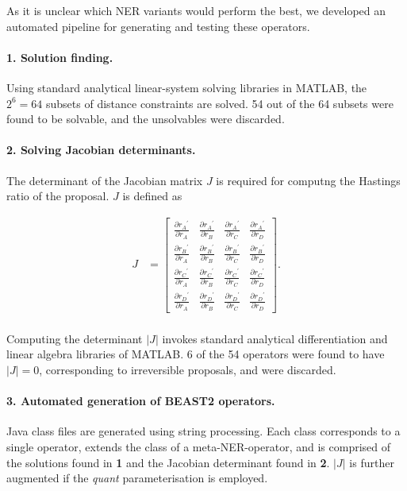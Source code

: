 \documentclass[10pt,letterpaper]{article}
\begin{document}
As it is unclear which NER variants would perform the best, we developed an automated pipeline for generating and testing these operators.


\paragraph{1. Solution finding.} Using standard analytical linear-system solving libraries in MATLAB, the $2^6=64$ subsets of distance constraints are solved. 54 out of the 64 subsets were found to be solvable, and the unsolvables were discarded.


\paragraph{2. Solving Jacobian determinants.} The determinant of the Jacobian matrix $J$ is required for computng the Hastings ratio of the proposal. $J$ is defined as 


\begin{align}
	J &= \begin{bmatrix} \frac{\partial {r_A}^\prime}{\partial r_A} & \frac{\partial {r_A}^\prime}{\partial r_B} & \frac{\partial {r_A}^\prime}{\partial r_C} & \frac{\partial {r_A}^\prime}{\partial r_D} \\
	\frac{\partial {r_B}^\prime}{\partial r_A} & \frac{\partial {r_B}^\prime}{\partial r_B} & \frac{\partial {r_B}^\prime}{\partial r_C} & \frac{\partial {r_B}^\prime}{\partial r_D} \\
	\frac{\partial {r_C}^\prime}{\partial r_A} & \frac{\partial {r_C}^\prime}{\partial r_B} & \frac{\partial {r_C}^\prime}{\partial r_C} & \frac{\partial {r_C}^\prime}{\partial r_D} \\
	\frac{\partial {r_D}^\prime}{\partial r_A} & \frac{\partial {r_D}^\prime}{\partial r_B} & \frac{\partial {r_D}^\prime}{\partial r_C} & \frac{\partial {r_D}^\prime}{\partial r_D} \end{bmatrix}.  \nonumber  \\
\end{align}


Computing the determinant $|J|$ invokes standard analytical differentiation and linear algebra libraries of MATLAB. 6 of the 54 operators were found to have $|J|=0$, corresponding to irreversible proposals, and were discarded. 


\paragraph{3. Automated generation of BEAST2 operators.} Java class files are generated using string processing. Each class corresponds to a single operator, extends the class of a meta-NER-operator, and is comprised of the solutions found in \textbf{1} and the Jacobian determinant found in \textbf{2}. $|J|$ is further augmented if the \textit{quant} parameterisation is employed.
\end{document}
